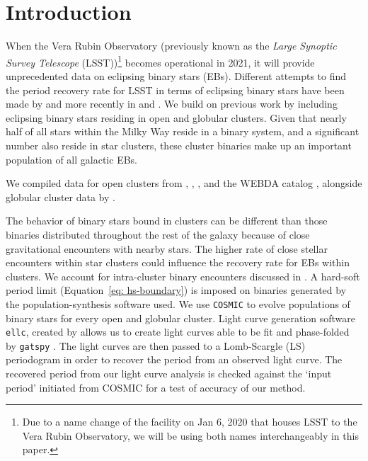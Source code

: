 \documentclass[twocolumn]{aastex63}
\begin{document}


\section{Introduction} \label{sec:Intro}
When the Vera Rubin Observatory (previously known as the \textit{Large Synoptic Survey Telescope} (LSST))\footnote{Due to a name change of the facility on Jan 6, 2020 that houses LSST to the Vera Rubin Observatory, we will be using both names interchangeably in this paper.} becomes operational in 2021, it will provide unprecedented data on eclipsing binary stars (EBs). Different attempts to find the period recovery rate for LSST in terms of eclipsing binary stars have been made by \citet{2011AJ....142...52P} and more recently in \citet{2017PASP..129f5003W} and \citet{2019AAS...23336317P}. We build on previous work by including eclipsing binary stars residing in open and globular clusters. Given that nearly half of all stars within the Milky Way reside in a binary system, and a significant number also reside in star clusters, these cluster binaries make up an important population of all galactic EBs. 

We compiled data for open clusters from \citet{2008A&A...477..165P}, \citet{2004A&A...414..163S}, \citet{2006AJ....131.1559V}, and the WEBDA catalog \citep{1995MNRAS.275..828M}, alongside globular cluster data by \citet{1996AJ....112.1487H}. 

The behavior of binary stars bound in clusters can be different than those binaries distributed throughout the rest of the galaxy because of close gravitational encounters with nearby stars. The higher rate of close stellar encounters within star clusters could influence the recovery rate for EBs within clusters. We account for intra-cluster binary encounters discussed in \citet{2015ApJ...808L..25G}. A hard-soft period limit (Equation~\ref{eq: hs-boundary}) is imposed on binaries generated by the population-synthesis software used. We use \texttt{COSMIC} \citep{2018PhDT........74B} to evolve populations of binary stars for every open and globular cluster. Light curve generation software \texttt{ellc}, created by \citet{2016ascl.soft03016M} allows us to create light curves able to be fit and phase-folded by \texttt{gatspy} \citep{2015ApJ...812...18V}. The light curves are then passed to a Lomb-Scargle (LS) periodogram in order to recover the period from an observed light curve. The recovered period from our light curve analysis is checked against the ‘input period’ initiated from COSMIC for a test of accuracy of our method.
\end{document}
